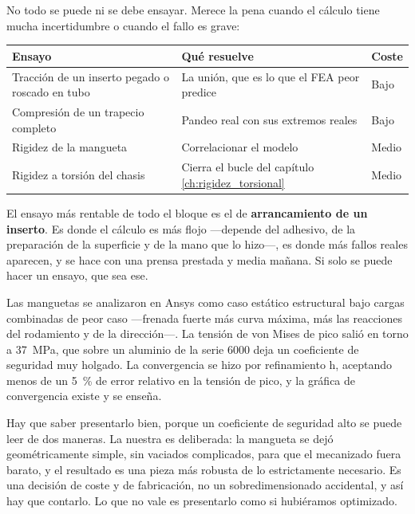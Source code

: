 No todo se puede ni se debe ensayar. Merece la pena cuando el cálculo tiene
mucha incertidumbre o cuando el fallo es grave:

\begin{center}
\begin{tabularx}{\textwidth}{@{}lXl@{}}
\toprule
\textbf{Ensayo} & \textbf{Qué resuelve} & \textbf{Coste} \\
\midrule
Tracción de un inserto pegado o roscado en tubo & La unión, que es lo que el FEA peor predice & Bajo \\
Compresión de un trapecio completo & Pandeo real con sus extremos reales & Bajo \\
Rigidez de la mangueta & Correlacionar el modelo & Medio \\
Rigidez a torsión del chasis & Cierra el bucle del capítulo \ref{ch:rigidez_torsional} & Medio \\
\bottomrule
\end{tabularx}
\end{center}

\begin{clave}
El ensayo más rentable de todo el bloque es el de \textbf{arrancamiento de un
inserto}. Es donde el cálculo es más flojo ---depende del adhesivo, de la
preparación de la superficie y de la mano que lo hizo---, es donde más fallos
reales aparecen, y se hace con una prensa prestada y media mañana. Si solo se
puede hacer un ensayo, que sea ese.
\end{clave}


\begin{caso}
Las manguetas se analizaron en Ansys como caso estático estructural bajo cargas
combinadas de peor caso ---frenada fuerte más curva máxima, más las reacciones
del rodamiento y de la dirección---. La tensión de von Mises de pico salió en
torno a \SI{37}{\mega\pascal}, que sobre un aluminio de la serie 6000 deja un
coeficiente de seguridad muy holgado. La convergencia se hizo por refinamiento
h, aceptando menos de un \SI{5}{\percent} de error relativo en la tensión de
pico, y la gráfica de convergencia existe y se enseña.

Hay que saber presentarlo bien, porque un coeficiente de seguridad alto se puede
leer de dos maneras. La nuestra es deliberada: la mangueta se dejó
geométricamente simple, sin vaciados complicados, para que el mecanizado fuera
barato, y el resultado es una pieza más robusta de lo estrictamente necesario.
Es una decisión de coste y de fabricación, no un sobredimensionado accidental, y
así hay que contarlo. Lo que no vale es presentarlo como si hubiéramos
optimizado.

\medskip
{}
\end{caso}

